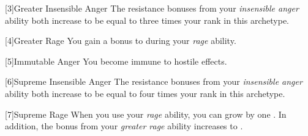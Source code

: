         [3]{Greater Insensible Anger} The resistance bonuses from your \textit{insensible anger} ability both increase to be equal to three times your rank in this archetype.

        [4]{Greater Rage} You gain a  bonus to  during your \textit{rage} ability.

        [5]{Immutable Anger} You become immune to hostile  effects.

        [6]{Supreme Insensible Anger} The resistance bonuses from your \textit{insensible anger} ability both increase to be equal to four times your rank in this archetype.

        [7]{Supreme Rage} When you use your \textit{rage} ability, you can grow by one .
        In addition, the  bonus from your \textit{greater rage} ability increases to .

